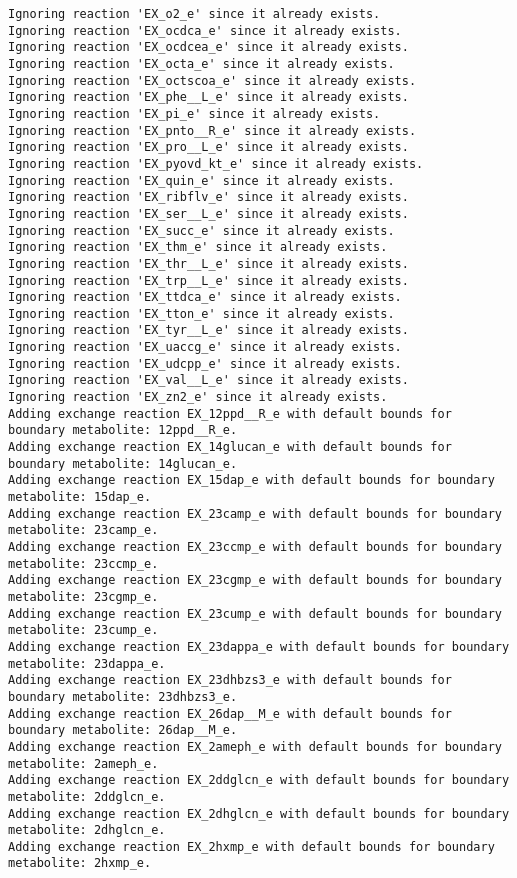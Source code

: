 \documentclass[
  letterpaper,
  DIV=11,
  numbers=noendperiod]{scrartcl}
\begin{document}
\begin{verbatim}
Ignoring reaction 'EX_o2_e' since it already exists.
Ignoring reaction 'EX_ocdca_e' since it already exists.
Ignoring reaction 'EX_ocdcea_e' since it already exists.
Ignoring reaction 'EX_octa_e' since it already exists.
Ignoring reaction 'EX_octscoa_e' since it already exists.
Ignoring reaction 'EX_phe__L_e' since it already exists.
Ignoring reaction 'EX_pi_e' since it already exists.
Ignoring reaction 'EX_pnto__R_e' since it already exists.
Ignoring reaction 'EX_pro__L_e' since it already exists.
Ignoring reaction 'EX_pyovd_kt_e' since it already exists.
Ignoring reaction 'EX_quin_e' since it already exists.
Ignoring reaction 'EX_ribflv_e' since it already exists.
Ignoring reaction 'EX_ser__L_e' since it already exists.
Ignoring reaction 'EX_succ_e' since it already exists.
Ignoring reaction 'EX_thm_e' since it already exists.
Ignoring reaction 'EX_thr__L_e' since it already exists.
Ignoring reaction 'EX_trp__L_e' since it already exists.
Ignoring reaction 'EX_ttdca_e' since it already exists.
Ignoring reaction 'EX_tton_e' since it already exists.
Ignoring reaction 'EX_tyr__L_e' since it already exists.
Ignoring reaction 'EX_uaccg_e' since it already exists.
Ignoring reaction 'EX_udcpp_e' since it already exists.
Ignoring reaction 'EX_val__L_e' since it already exists.
Ignoring reaction 'EX_zn2_e' since it already exists.
Adding exchange reaction EX_12ppd__R_e with default bounds for boundary metabolite: 12ppd__R_e.
Adding exchange reaction EX_14glucan_e with default bounds for boundary metabolite: 14glucan_e.
Adding exchange reaction EX_15dap_e with default bounds for boundary metabolite: 15dap_e.
Adding exchange reaction EX_23camp_e with default bounds for boundary metabolite: 23camp_e.
Adding exchange reaction EX_23ccmp_e with default bounds for boundary metabolite: 23ccmp_e.
Adding exchange reaction EX_23cgmp_e with default bounds for boundary metabolite: 23cgmp_e.
Adding exchange reaction EX_23cump_e with default bounds for boundary metabolite: 23cump_e.
Adding exchange reaction EX_23dappa_e with default bounds for boundary metabolite: 23dappa_e.
Adding exchange reaction EX_23dhbzs3_e with default bounds for boundary metabolite: 23dhbzs3_e.
Adding exchange reaction EX_26dap__M_e with default bounds for boundary metabolite: 26dap__M_e.
Adding exchange reaction EX_2ameph_e with default bounds for boundary metabolite: 2ameph_e.
Adding exchange reaction EX_2ddglcn_e with default bounds for boundary metabolite: 2ddglcn_e.
Adding exchange reaction EX_2dhglcn_e with default bounds for boundary metabolite: 2dhglcn_e.
Adding exchange reaction EX_2hxmp_e with default bounds for boundary metabolite: 2hxmp_e.

\end{verbatim}
\end{document}

